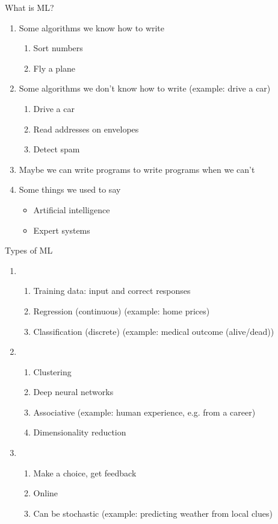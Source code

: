 




What is ML?
\begin{enumerate}
\item Some algorithms we know how to write
  \begin{enumerate}
  \item Sort numbers
  \item Fly a plane
  \end{enumerate}
\item Some algorithms we don't know how to write (example: drive a car)
  \begin{enumerate}
  \item Drive a car 
  \item Read addresses on envelopes
  \item Detect spam
  \end{enumerate}
\item Maybe we can write programs to write programs when we can't
\item Some things we used to say
  \begin{itemize}
  \item Artificial intelligence
  \item Expert systems
  \end{itemize}
\end{enumerate}

Types of ML
\begin{enumerate}
\item {}
  \begin{enumerate}
  \item Training data: input and correct responses
  \item Regression (continuous) (example: home prices)
  \item Classification (discrete) (example: medical outcome (alive/dead))
  \end{enumerate}
\item {}
  \begin{enumerate}
  \item Clustering
  \item Deep neural networks
  \item Associative (example: human experience, e.g. from a career)
  \item Dimensionality reduction
  \end{enumerate}
\item {}
  \begin{enumerate}
  \item Make a choice, get feedback
  \item Online
  \item Can be stochastic (example: predicting weather from local clues)
  \end{enumerate}
\end{enumerate}

